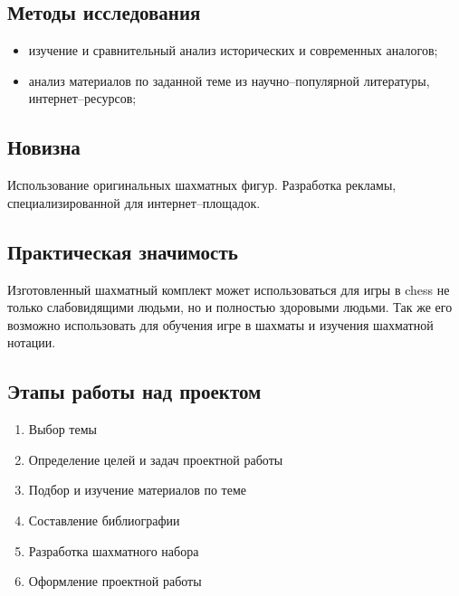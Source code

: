\subsection*{Методы исследования}
\begin{itemize}
    \item изучение и сравнительный анализ исторических и современных аналогов;
    \item анализ материалов по заданной теме из научно--популярной литературы,
        интернет--ресурсов;
\end{itemize}

\subsection*{Новизна}
Использование оригинальных шахматных фигур. Разработка рекламы,
специализированной для интернет--площадок.

\subsection*{Практическая значимость}
Изготовленный шахматный комплект может использоваться для игры в \gls{chess} не
только слабовидящими людьми, но и полностью здоровыми людьми. Так же его
возможно использовать для обучения игре в шахматы и изучения шахматной нотации.

\subsection*{Этапы работы над проектом}
\begin{enumerate}
    \item Выбор темы
    \item Определение целей и задач проектной работы
    \item Подбор и изучение материалов по теме
    \item Составление библиографии
    \item Разработка шахматного набора
    \item Оформление проектной работы
\end{enumerate}

